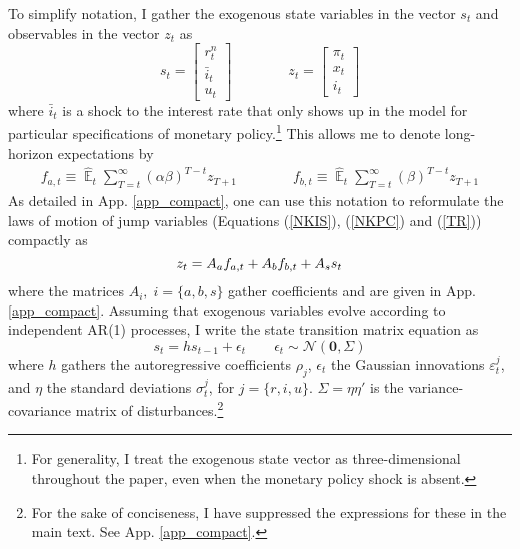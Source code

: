 \documentclass[11pt]{article}
\renewcommand{\[}{\begin{equation}}
\renewcommand{\]}{\end{equation}}
\DeclareMathOperator{\E}{\mathbb{E}}
\begin{document}
To simplify notation, I gather the exogenous state variables in the vector $s_t$ and observables in the vector $z_t$ as
\begin{equation}
s_t =  \begin{bmatrix}r_t^n \\ \bar{i}_t \\ u_t \end{bmatrix} \quad \quad \quad \quad  z_t = \begin{bmatrix}\pi_t \\ x_t \\ i_t \end{bmatrix}
\end{equation}
where $\bar{i}_t$ is a shock to the interest rate that only shows up in the model for particular specifications of monetary policy.\footnote{For generality, I treat the exogenous state vector as three-dimensional throughout the paper, even when the monetary policy shock is absent.} This allows me to denote long-horizon expectations by 
 \begin{align}
f_{a,t}  \equiv  \hat{\E}_t\sum_{T=t}^{\infty} (\alpha\beta)^{T-t } z_{T+1} \quad \quad \quad \quad f_{b,t}  \equiv \hat{\E}_t\sum_{T=t}^{\infty} (\beta)^{T-t } z_{T+1} \label{fafb}
\end{align}
As detailed in App. \ref{app_compact}, one can use this notation to reformulate the laws of motion of jump variables (Equations (\ref{NKIS}), (\ref{NKPC}) and (\ref{TR})) compactly as
\begin{equation}
z_t  = A_af_{a,t} + A_b f_{b,t} + A_s s_t \label{LOM_LR} \\
\end{equation}
where the matrices $A_i, \; i=\{a,b,s\}$ gather coefficients and are given in App. \ref{app_compact}. Assuming that exogenous variables evolve according to independent AR(1) processes, I write the state transition matrix equation as
 \begin{equation}
 s_t  = h s_{t-1} + \epsilon_t  \quad \quad \epsilon_t \sim \mathcal{N}(\mathbf{0}, \Sigma) \label{LOM_s}
 \end{equation}
where $h$ gathers the autoregressive coefficients $\rho_j$, $\epsilon_t$ the Gaussian innovations $\varepsilon_t^j$, and $\eta$ the standard deviations $\sigma_t^j$, for $j=\{r,i,u\}$. $\Sigma = \eta \eta'$  is the variance-covariance matrix of disturbances.\footnote{For the sake of conciseness, I have suppressed the expressions for these in the main text. See App. \ref{app_compact}.}
\end{document}
